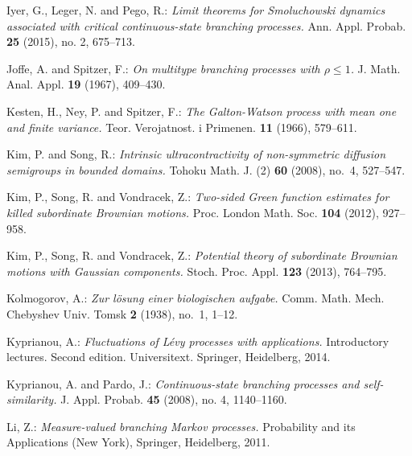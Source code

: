 \documentclass[12pt,a4paper]{amsart}
\theoremstyle{definition}
\numberwithin{equation}{section}
\begin{document}
\begin{thebibliography}{10}
	
	Iyer, G., Leger, N. and Pego, R.:
	\emph{Limit theorems for Smoluchowski dynamics associated with critical continuous-state branching processes.}
	Ann. Appl. Probab. \textbf{25} (2015), no. 2, 675–713.

	
	Joffe, A. and Spitzer, F.:
	\emph{On multitype branching processes with {$\rho \leq 1$}.}
	J. Math. Anal. Appl. \textbf{19} (1967), 409--430.
	
	
	Kesten, H., Ney, P. and Spitzer, F.:
	\emph{The {G}alton-{W}atson process with mean one and finite variance.}
	Teor. Verojatnost. i Primenen. \textbf{11} (1966), 579--611.
	
	
	Kim, P. and Song, R.:
	\emph{Intrinsic ultracontractivity of non-symmetric diffusion semigroups in bounded domains.}
	Tohoku Math. J. (2) \textbf{60} (2008), no.~4, 527--547.

  Kim, P., Song, R. and Vondracek, Z.:
  \emph{Two-sided Green function estimates for killed subordinate Brownian motions.}
  Proc. London Math. Soc. \textbf{104} (2012), 927--958.

  Kim, P., Song, R. and Vondracek, Z.:
  \emph{Potential theory of subordinate Brownian motions with Gaussian components.}
  Stoch. Proc. Appl. \textbf{123} (2013), 764--795.
	
	Kolmogorov, A.:
	\emph{Zur l{\"o}sung einer biologischen aufgabe.}
	Comm. Math. Mech. Chebyshev Univ. Tomsk \textbf{2} (1938), no.~1, 1--12.
	
	Kyprianou, A.:
	\emph{Fluctuations of Lévy processes with applications.}
	Introductory lectures. Second edition. Universitext. Springer, Heidelberg, 2014.
	
	
	Kyprianou, A. and Pardo, J.:
	\emph{Continuous-state branching processes and self-similarity.}
	J. Appl. Probab. \textbf{45} (2008), no. 4, 1140–1160.

	Li, Z.:
	\emph{Measure-valued branching {M}arkov processes.}
	Probability and its Applications (New York), Springer, Heidelberg, 2011.


\end{thebibliography}
\end{document}

